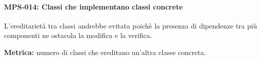 \documentclass[../../norme-di-progetto.tex]{subfiles}
\begin{document}
\paragraph{MPS-014: Classi che implementano classi concrete}%
\label{par:MPS-014_classi_implementano_concrete}
L'ereditarietà tra classi andrebbe evitata poichè la presenza di dipendenze tra più componenti ne ostacola la modifica e la verifica.

\textbf{Metrica:} numero di classi che ereditano un'altra classe concreta.


\end{document}
